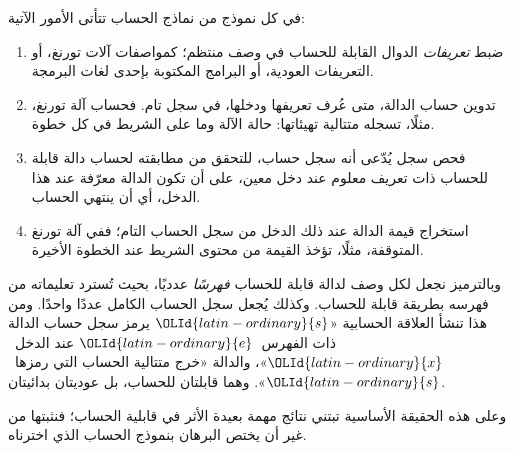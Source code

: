 \documentclass[../../../include/open-logic-section]{subfiles}
\begin{document}

في كل نموذج من نماذج الحساب تتأتى الأمور الآتية:
\begin{enumerate}
\item ضبط \emph{تعريفات} الدوال القابلة للحساب في وصف منتظم؛
  كمواصفات آلات تورنغ، أو التعريفات العودية، أو البرامج المكتوبة
  بإحدى لغات البرمجة.
\item تدوين حساب الدالة، متى عُرف تعريفها ودخلها، في سجل تام. فحساب
  آلة تورنغ، مثلًا، تسجله متتالية تهيئاتها: حالة الآلة وما على
  الشريط في كل خطوة.
\item فحص سجل يُدّعى أنه سجل حساب، للتحقق من مطابقته لحساب
  دالة قابلة للحساب ذات تعريف معلوم عند دخل معين، على أن تكون الدالة معرّفة
  عند هذا الدخل، أي أن ينتهي الحساب.
\item استخراج قيمة الدالة عند ذلك الدخل من سجل
  الحساب التام؛ ففي آلة تورنغ المتوقفة، مثلًا، تؤخذ القيمة من محتوى الشريط
  عند الخطوة الأخيرة.
\end{enumerate}

وبالترميز نجعل لكل وصف لدالة قابلة للحساب \emph{فهرسًا} عدديًا،
بحيث تُسترد تعليماته من فهرسه بطريقة قابلة
للحساب. وكذلك يُجعل سجل الحساب الكامل عددًا واحدًا. ومن هذا
تنشأ العلاقة الحسابية «${\OLId{latin-ordinary}{s}}$ يرمز سجل حساب الدالة ذات الفهرس~${\OLId{latin-ordinary}{e}}$
عند الدخل~${\OLId{latin-ordinary}{x}}$»، والدالة «خرج متتالية الحساب التي رمزها~${\OLId{latin-ordinary}{s}}$». وهما قابلتان
للحساب، بل عوديتان بدائيتان.

وعلى هذه الحقيقة الأساسية تبتني نتائج مهمة بعيدة الأثر
في قابلية الحساب؛ فنثبتها من غير أن يختص البرهان بنموذج الحساب
الذي اخترناه.
\end{document}
